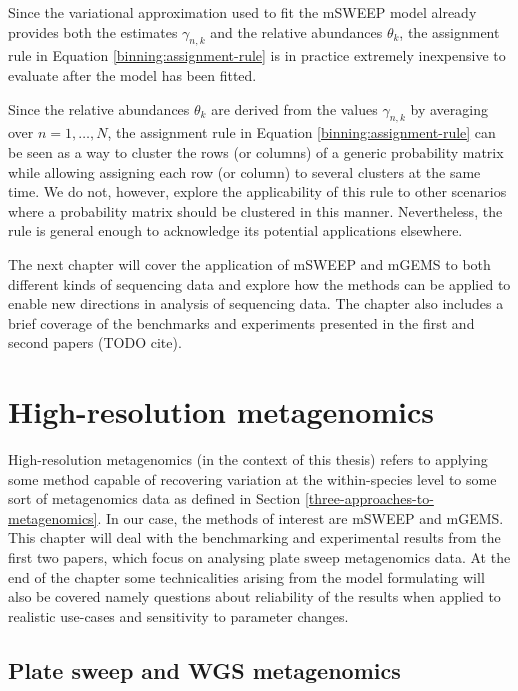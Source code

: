 \documentclass[officiallayout]{tktla}
\begin{document}
Since the variational approximation used to fit the mSWEEP model
already provides both the estimates $\gamma_{n, k}$ and the relative
abundances $\theta_{k}$, the assignment rule in Equation
\ref{binning:assignment-rule} is in practice extremely inexpensive to
evaluate after the model has been fitted.

Since the relative abundances $\theta_k$ are derived from the values
$\gamma_{n, k}$ by averaging over $n = 1, \dots, N$, the assignment
rule in Equation \ref{binning:assignment-rule} can be seen as a way to
cluster the rows (or columns) of a generic probability matrix while
allowing assigning each row (or column) to several clusters at the
same time. We do not, however, explore the applicability of this rule
to other scenarios where a probability matrix should be clustered in
this manner. Nevertheless, the rule is general enough to acknowledge
its potential applications elsewhere.

The next chapter will cover the application of mSWEEP and mGEMS to
both different kinds of sequencing data and explore how the methods
can be applied to enable new directions in analysis of sequencing
data. The chapter also includes a brief coverage of the benchmarks and
experiments presented in the first and second papers (TODO cite).

\chapter{High-resolution metagenomics}

High-resolution metagenomics (in the context of this thesis) refers to
applying some method capable of recovering variation at the
within-species level to some sort of metagenomics data as defined in
Section \ref{three-approaches-to-metagenomics}. In our case, the
methods of interest are mSWEEP and mGEMS. This chapter will deal with
the benchmarking and experimental results from the first two papers,
which focus on analysing plate sweep metagenomics data. At the end of
the chapter some technicalities arising from the model formulating will
also be covered \textemdash namely questions about reliability of the
results when applied to realistic use-cases and sensitivity to
parameter changes.

\section{Plate sweep and WGS metagenomics}
\end{document}
